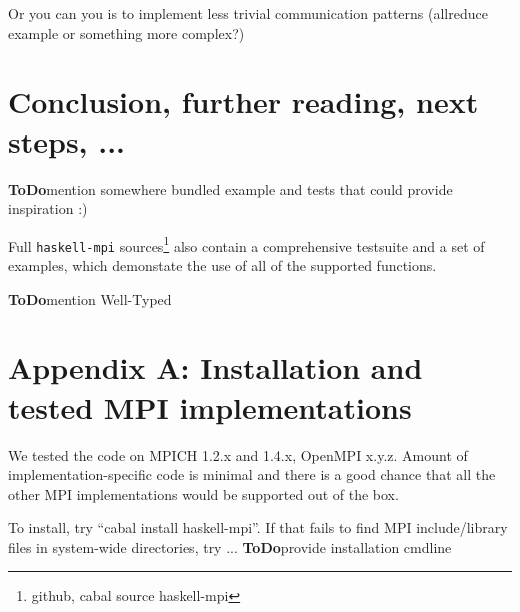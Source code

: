 \documentclass{tmr}
\newcommand{\ToDo}[1]{\textbf{ToDo}{#1}}
\begin{document}
Or you can you is to implement less trivial communication patterns (allreduce example or something more complex?)


\section{Conclusion, further reading, next steps, ...}

\ToDo mention somewhere bundled example and tests that could provide inspiration :)

Full \verb|haskell-mpi| sources\footnote{github, cabal source
  haskell-mpi} also contain a comprehensive testsuite and a set of
examples, which demonstate the use of all of the supported functions.

\ToDo mention Well-Typed

\section{Appendix A: Installation and tested MPI implementations}
\label{appendix-A}
We tested the code on MPICH 1.2.x and 1.4.x, OpenMPI x.y.z. Amount of implementation-specific code is minimal and there is a good chance that all the other MPI implementations would be supported out of the box.

To install, try ``cabal install haskell-mpi''. If that fails to find MPI include/library files in system-wide directories, try ...
\ToDo provide installation cmdline


\end{document}
